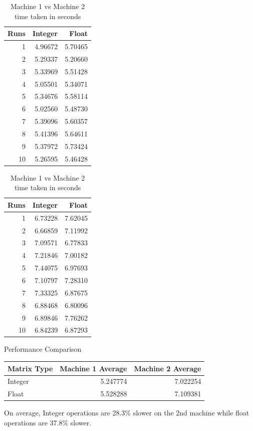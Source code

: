 \documentclass[
]{article}
\begin{document}
\begin{table}
\caption{\label{tab:unnamed-chunk-6}Machine 1 vs Machine 2 time taken in seconds}

\centering
\begin{tabular}[t]{r|r|r}
\hline
Runs & Integer & Float\\
\hline
1 & 4.96672 & 5.70465\\
\hline
2 & 5.29337 & 5.20660\\
\hline
3 & 5.33969 & 5.51428\\
\hline
4 & 5.05501 & 5.34071\\
\hline
5 & 5.34676 & 5.58114\\
\hline
6 & 5.02560 & 5.48730\\
\hline
7 & 5.39096 & 5.60357\\
\hline
8 & 5.41396 & 5.64611\\
\hline
9 & 5.37972 & 5.73424\\
\hline
10 & 5.26595 & 5.46428\\
\hline
\end{tabular}
\centering
\begin{tabular}[t]{r|r|r}
\hline
Runs & Integer & Float\\
\hline
1 & 6.73228 & 7.62045\\
\hline
2 & 6.66859 & 7.11992\\
\hline
3 & 7.09571 & 6.77833\\
\hline
4 & 7.21846 & 7.00182\\
\hline
5 & 7.44075 & 6.97693\\
\hline
6 & 7.10797 & 7.28310\\
\hline
7 & 7.33325 & 6.87675\\
\hline
8 & 6.88468 & 6.80096\\
\hline
9 & 6.89846 & 7.76262\\
\hline
10 & 6.84239 & 6.87293\\
\hline
\end{tabular}
\end{table}

Performance Comparison

\begin{longtable}[]{@{}lrr@{}}
\toprule
Matrix Type & Machine 1 Average & Machine 2 Average\tabularnewline
\midrule
\endhead
Integer & 5.247774 & 7.022254\tabularnewline
Float & 5.528288 & 7.109381\tabularnewline
\bottomrule
\end{longtable}

On average, Integer operations are 28.3\% slower on the 2nd machine
while float operations are 37.8\% slower.
\end{document}
